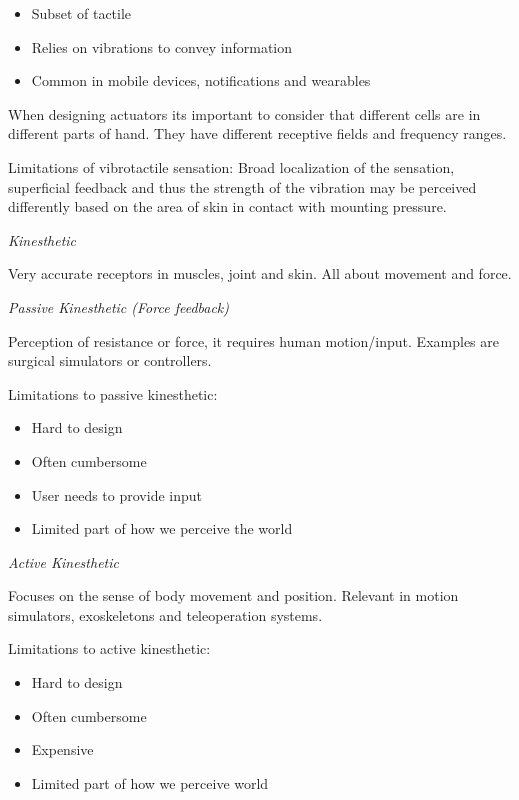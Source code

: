 \begin{itemize}[itemsep=-5pt, topsep=0pt, leftmargin=*]
	\item Subset of tactile
	\item Relies on vibrations to convey information
	\item Common in mobile devices, notifications and wearables
\end{itemize}


When designing actuators its important to consider that different cells are in different parts of hand. 
They have different receptive fields and frequency ranges. \smallskip

Limitations of vibrotactile sensation: Broad localization of the sensation, superficial feedback and thus the strength of the vibration may be perceived differently based on the area of skin in contact with mounting pressure. 
\medskip

\textit{Kinesthetic} \smallskip

Very accurate receptors in muscles, joint and skin. All about movement and force.  \smallskip

\columnbreak

\textit{Passive Kinesthetic (Force feedback)} \smallskip

Perception of resistance or force, it requires human motion/input. Examples are surgical simulators or controllers. \medskip


Limitations to passive kinesthetic: 


\begin{itemize}[itemsep=-5pt, topsep=0pt, leftmargin=*]
	\item Hard to design
	\item Often cumbersome
	\item User needs to provide input
	\item Limited part of how we perceive the world
\end{itemize}

\medskip

\textit{Active Kinesthetic} \smallskip

Focuses on the sense of body movement and position. Relevant in motion simulators, exoskeletons and teleoperation systems. 


Limitations to active kinesthetic: 


\begin{itemize}[itemsep=-5pt, topsep=0pt, leftmargin=*]
	\item Hard to design
	\item Often cumbersome
	\item Expensive
	\item Limited part of how we perceive world
\end{itemize} \medskip

